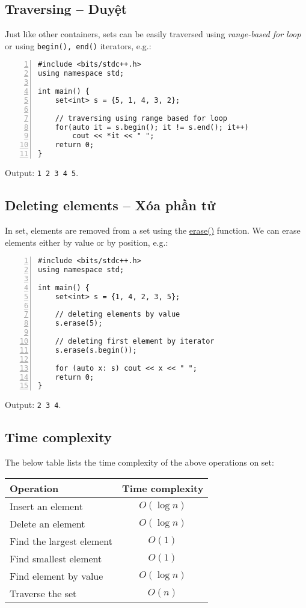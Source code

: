 \documentclass{article}
\begin{document}

\subsection{Traversing -- Duyệt}
Just like other containers, sets can be easily traversed using {\it range-based for loop} or using {\tt begin(), end()} iterators, e.g.:
\begin{Verbatim}[numbers=left,xleftmargin=5mm]
#include <bits/stdc++.h>
using namespace std;

int main() {
    set<int> s = {5, 1, 4, 3, 2};
	
    // traversing using range based for loop
    for(auto it = s.begin(); it != s.end(); it++)
        cout << *it << " ";
    return 0;
}
\end{Verbatim}
Output: {\tt1 2 3 4 5}.


\subsection{Deleting elements -- Xóa phần tử}
In set, elements are removed from a set using the \href{https://www.geeksforgeeks.org/seterase-c-stl/}{erase()} function. We can erase elements either by value or by position, e.g.:
\begin{Verbatim}[numbers=left,xleftmargin=5mm]
#include <bits/stdc++.h>
using namespace std;

int main() {
    set<int> s = {1, 4, 2, 3, 5};
	
    // deleting elements by value
    s.erase(5);
	
    // deleting first element by iterator
    s.erase(s.begin());
	
    for (auto x: s) cout << x << " ";
    return 0;
}
\end{Verbatim}
Output: {\tt2 3 4}.


\subsection{Time complexity}
The below table lists the time complexity of the above operations on set:
\begin{table}[H]
	\centering
	\begin{tabular}{|l|c|}
		\hline
		Operation & Time complexity \\
		\hline
		Insert an element & $O(\log n)$ \\
		\hline
		Delete an element & $O(\log n)$ \\
		\hline
		Find the largest element & $O(1)$ \\
		\hline
		Find smallest element & $O(1)$ \\
		\hline
		Find element by value & $O(\log n)$ \\
		\hline
		Traverse the set & $O(n)$ \\
		\hline
	\end{tabular}
\end{table}
\end{document}
